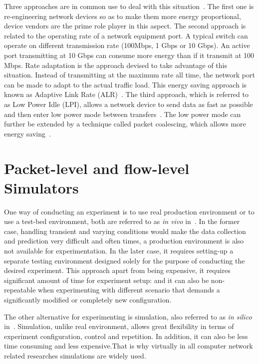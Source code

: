 Three approaches are in common use to deal with this situation~\cite{DBLP:journals/comsur/BollaBDC11}. The first one is re-engineering network devices so as to make them more energy proportional, device vendors are the prime role player in this aspect. The second approach is related to the operating rate of a network equipment port. A typical switch can operate on different transmission rate (100Mbps, 1 Gbps or 10 Gbps). An active port transmitting at 10 Gbps can consume more energy than if it transmit at 100 Mbps. Rate adaptation is the approach devised to take advantage of this situation. Instead of transmitting at the maximum rate all time,  the network port can be made to adapt to the actual traffic load. This energy saving approach is known as Adaptive Link Rate (ALR)~\cite{DBLP:conf/nsdi/NedevschiPIRW08}. The third approach, which is referred to as Low Power Idle (LPI), allows a network device to send data as fast as possible and then enter low power mode between transfers~\cite{DBLP:journals/computer/BarrosoH07}. The low power mode can further be extended by a technique called packet coalescing, which allows more energy saving~\cite{DBLP:journals/comsur/BollaBDC11}. 
\section{Packet-level and flow-level Simulators}
\label{section:packetflow} 
One way of conducting an experiment is to use real production environment or to use a test-bed environment, both are referred to as \emph{in vivo} in~\cite{DBLP:journals/jpdc/CasanovaGLQS14}. In the former case, handling transient and varying conditions would make the data collection and prediction very difficult and often times, a production environment is also not available for experimentation. In the later case, it requires setting-up a separate testing environment designed solely for the purpose of conducting the desired experiment. This approach apart from being expensive, it requires significant amount of time for experiment setup: and it can also be non-repeatable when experimenting with different scenario that demands a significantly modified or completely new configuration.

The other alternative for experimenting is simulation, also referred to as \emph{in silico} in~\cite{DBLP:journals/jpdc/CasanovaGLQS14}. Simulation, unlike real environment, allows great flexibility in terms of experiment configuration, control and repetition. In addition, it can also be less time consuming and less expensive.That is why virtually in all computer network related researches simulations are widely used. 


